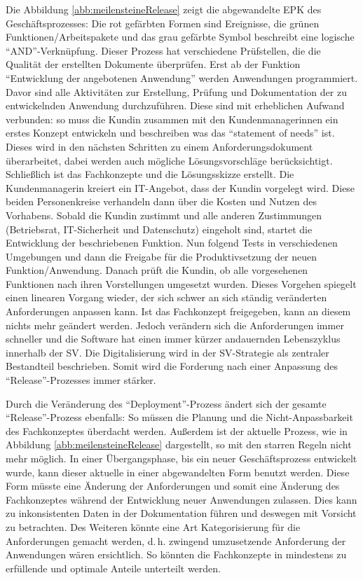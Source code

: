 Die Abbildung \vref{abb:meilensteineRelease} zeigt die abgewandelte \ac{EPK} des Geschäftsprozesses: Die rot gefärbten Formen sind Ereignisse, die grünen Funktionen/Arbeitspakete und das grau gefärbte Symbol beschreibt eine logische \enquote{AND}-Verknüpfung. Dieser Prozess hat verschiedene Prüfstellen, die die Qualität der erstellten Dokumente überprüfen. Erst ab der Funktion \enquote{Entwicklung der angebotenen Anwendung} werden Anwendungen programmiert. Davor sind alle Aktivitäten zur Erstellung, Prüfung und Dokumentation der zu entwickelnden Anwendung durchzuführen. Diese sind mit erheblichen Aufwand verbunden: so muss die Kundin zusammen mit den Kundenmanagerinnen ein erstes Konzept entwickeln und beschreiben was das \enquote{statement of needs} ist. Dieses wird in den nächsten Schritten zu einem Anforderungsdokument überarbeitet, dabei werden auch mögliche Lösungsvorschläge berücksichtigt. Schließlich ist das Fachkonzepte und die Lösungsskizze erstellt. Die Kundenmanagerin kreiert ein IT-Angebot, dass der Kundin vorgelegt wird. Diese beiden Personenkreise verhandeln dann über die Kosten und Nutzen des Vorhabens. Sobald die Kundin zustimmt und alle anderen Zustimmungen (Betriebsrat, IT-Sicherheit und Datenschutz) eingeholt sind, startet die Entwicklung der beschriebenen Funktion. Nun folgend Tests in verschiedenen Umgebungen und dann die Freigabe für die Produktivsetzung der neuen Funktion/Anwendung. Danach prüft die Kundin, ob alle vorgesehenen Funktionen nach ihren Vorstellungen umgesetzt wurden. Dieses Vorgehen spiegelt einen linearen Vorgang wieder, der sich schwer an sich ständig veränderten Anforderungen anpassen kann. Ist das Fachkonzept freigegeben, kann an diesem nichts mehr geändert werden. Jedoch verändern sich die Anforderungen immer schneller und die Software hat einen immer kürzer andauernden Lebenszyklus innerhalb der \ac{SV}. Die Digitalisierung wird in der \ac{SV}-Strategie als zentraler Bestandteil beschrieben.\autocite[vgl.][]{sv_sparkassenversicherung_sv_2019} Somit wird die Forderung nach einer Anpassung des \enquote{Release}-Prozesses immer stärker.
\par
Durch die Veränderung des \enquote{Deployment}-Prozess ändert sich der gesamte \enquote{Release}-Prozess ebenfalls: So müssen die Planung und die Nicht-Anpassbarkeit des Fachkonzeptes überdacht werden. Außerdem ist der aktuelle Prozess, wie in Abbildung \vref{abb:meilensteineRelease} dargestellt, so mit den starren Regeln nicht mehr möglich. In einer Übergangsphase, bis ein neuer Geschäftsprozess entwickelt wurde, kann dieser aktuelle in einer abgewandelten Form benutzt werden. Diese Form müsste eine Änderung der Anforderungen und somit eine Änderung des Fachkonzeptes während der Entwicklung neuer Anwendungen zulassen. Dies kann zu inkonsistenten Daten in der Dokumentation führen und deswegen mit Vorsicht zu betrachten. Des Weiteren könnte eine Art Kategorisierung für die Anforderungen gemacht werden, d.\,h. zwingend umzusetzende Anforderung der Anwendungen wären ersichtlich. So könnten die Fachkonzepte in mindestens zu erfüllende und optimale Anteile unterteilt werden. 
